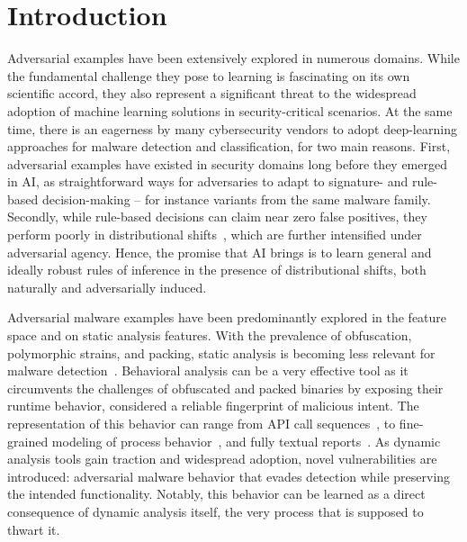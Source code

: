\section{Introduction}
Adversarial examples have been extensively explored in numerous domains. While the fundamental challenge they pose to learning is fascinating on its own scientific accord, they also represent a significant threat to the widespread adoption of machine learning solutions in security-critical scenarios.
At the same time, there is an eagerness by many cybersecurity vendors to adopt deep-learning approaches for malware detection and classification, for two main reasons.
First, adversarial examples have existed in security domains long before they emerged in \gls{AI}, as straightforward ways for adversaries to adapt to signature- and rule-based decision-making -- for instance variants from the same malware family.
Secondly, while rule-based decisions can claim near zero false positives, they perform poorly in distributional shifts~\cite{upadhyay2021towards}, which are further intensified under adversarial agency.
Hence, the promise that \gls{AI} brings is to learn general and ideally robust rules of inference in the presence of distributional shifts, both naturally and adversarially induced.

Adversarial malware examples have been predominantly explored in the feature space and on static analysis features.
With the prevalence of obfuscation, polymorphic strains, and packing, static analysis is becoming less relevant for malware detection~\cite{aghakhani2020malware}.
Behavioral analysis can be a very effective tool as it circumvents the challenges of obfuscated and packed binaries by exposing their runtime behavior, considered a reliable fingerprint of malicious intent.
The representation of this behavior can range from API call sequences~\cite{tian2010differentiating, rosenberg2018generic}, to fine-grained modeling of process behavior~\cite{continella2016shieldfs}, and fully textual reports~\cite{mandlik2022jsongrinder}.
As dynamic analysis tools gain traction and widespread adoption, novel vulnerabilities are introduced: adversarial malware behavior that evades detection while preserving the intended functionality.
Notably, this behavior can be learned as a direct consequence of dynamic analysis itself, the very process that is supposed to thwart it.

